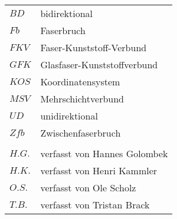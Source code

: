 \begin{longtable}[l]{ll}
\onehalfspacing
$ BD $& bidirektional\\
$Fb$&Faserbruch\\
$FKV$&Faser-Kunststoff-Verbund\\
$GFK$& Glasfaser-Kunststoffverbund\\
 $ KOS$& Koordinatensystem\\
$MSV$&Mehrschichtverbund\\
$UD$&unidirektional\\
$Zfb$&Zwischenfaserbruch\\
&\\
$H.G.$& verfasst von Hannes Golombek\\
$H.K.$& verfasst von Henri Kammler\\
$O.S.$& verfasst von Ole Scholz\\
$T.B.$& verfasst von Tristan Brack\\
\end{longtable}

